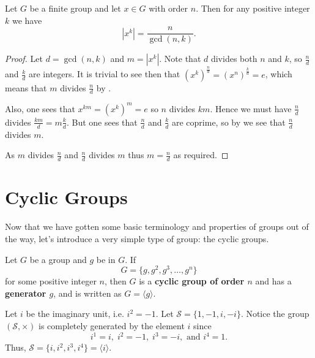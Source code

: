 \begin{theorem}\label{thrm-order-of-power-of-element}
    Let $G$ be a finite group and let $x \in G$ with order $n$. Then for any positive integer $k$ we have
    \[
        \left|x^k\right| = \frac{n}{\gcd(n,k)}.
    \]
\end{theorem}
\begin{proof}
    Let $d = \gcd(n,k)$ and $m = |x^k|$. Note that $d$ divides both $n$ and $k$, so $\frac nd$ and $\frac kd$ are integers. It is trivial to see then that $(x^k)^{\frac nd} = \left(x^n\right)^{\frac kd} = e$, which means that $m$ divides $\frac nd$ by .

    Also, one sees that $x^{km} = (x^k)^m = e$ so $n$ divides $km$. Hence we must have $\frac nd$ divides $\frac {km}{d} = m\frac kd$. But one sees that $\frac nd$ and $\frac kd$ are coprime, so by  we see that $\frac nd$ divides $m$.

    As $m$ divides $\frac nd$ and $\frac nd$ divides $m$ thus $m = \frac nd$ as required.
\end{proof}

\section{Cyclic Groups}
Now that we have gotten some basic terminology and properties of groups out of the way, let's introduce a very simple type of group: the cyclic groups.

\begin{definition}
    Let $G$ be a group and $g$ be in $G$. If
    \[
        G = \{g, g^2, g^3, \dots, g^n\}
    \]
    for some positive integer $n$, then $G$ is a \textbf{cyclic group of order $n$} and has a \textbf{generator $g$}, and is written as $G = \langle g \rangle$.
\end{definition}

\begin{example}
    Let $i$ be the imaginary unit, i.e. $i^2 = -1$. Let $\mathcal{S} = \{1, -1, i, -i\}$. Notice the group $(\mathcal{S}, \times)$ is completely generated by the element $i$ since
    \[
    i^1 = i,\; i^2 = -1,\; i^3 = -i, \text{ and } i^4 = 1.
    \]
    Thus, $\mathcal{S} = \{i, i^2, i^3, i^4\} = \langle i \rangle$.
\end{example}

